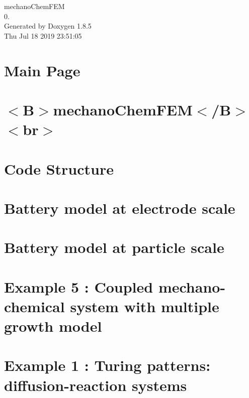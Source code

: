\documentclass[twoside]{book}
\newcommand{\clearemptydoublepage}{%
  \newpage{\pagestyle{empty}\cleardoublepage}%
}
\begin{document}
\begin{titlepage}
\vspace*{7cm}
\begin{center}%
{\Large mechano\-Chem\-F\-E\-M \\[1ex]\large 0. }\\
\vspace*{1cm}
{\large Generated by Doxygen 1.8.5}\\
\vspace*{0.5cm}
{\small Thu Jul 18 2019 23:51:05}\\
\end{center}
\end{titlepage}
\clearemptydoublepage
\tableofcontents
\clearemptydoublepage
{}

\chapter{Main Page}
\label{index}\hypertarget{index}{}
\chapter{$<$B$>$mechano\-Chem\-F\-E\-M$<$/\-B$>$$<$br$>$}
\label{md_mechano_chem_f_e_m_readme}

\chapter{Code Structure}
\label{codestructure}

\chapter{Battery model at electrode scale}
\label{battery_electrode_scale}

\chapter{Battery model at particle scale}
\label{battery_particle}

\chapter{Example 5 \-: Coupled mechano-\/chemical system with multiple growth model}
\label{brain_morph}

\chapter{Example 1 \-: Turing patterns\-: diffusion-\/reaction systems}
\label{diffusion_reaction}

\end{document}
